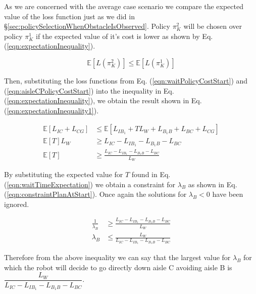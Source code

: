 \documentclass[a4paper,12pt]{article}
\begin{document}
			As we are concerned with the average case scenario we compare the expected value of the loss function just as we did in \S \ref{sec:policySelectionWhenObstacleIsObserved}. Policy $\pi_{K}^{2}$ will be chosen over policy $\pi_{K}^{1}$ if the expected value of it's cost is lower as shown by Eq. (\ref{eqn:expectationInequality}).
			
			\begin{equation}
			\mathbb{E}\left[L\left(\pi_{K}^{2}\right)\right] \leq \mathbb{E}\left[L\left(\pi_{K}^{1}\right)\right]
			\label{eqn:expectationInequality}
			\end{equation}
			
			Then, substituting the loss functions from Eq. (\ref{eqn:waitPolicyCostStart}) and (\ref{eqn:aisleCPolicyCostStart}) into the inequality in Eq. (\ref{eqn:expectationInequality}), we obtain the result shown in Eq. (\ref{eqn:expectationInequality1}).
			
			\begin{equation}
			\begin{split}
			\mathbb{E}[L_{IC}+L_{CG}] &\leq \mathbb{E}[L_{IB_1}+TL_W + L_{B_1B}+L_{BC}+L_{CG}] \\
			\mathbb{E}[T]L_W &\geq L_{IC}-L_{IB_1}-L_{B_1B}-L_{BC}\\
			\mathbb{E}[T] &\geq \frac{L_{IC}-L_{IB_1}-L_{B_1B}-L_{BC}}{L_W}
			\end{split}
			\label{eqn:expectationInequality1}
			\end{equation}
			
			By substituting the expected value for $T$ found in Eq. (\ref{eqn:waitTimeExpectation}) we obtain a constraint for $\lambda_B$ as shown in Eq. (\ref{eqn:constraintPlanAtStart}). Once again the solutions for $\lambda_B < 0$ have been ignored. 
			
			\begin{equation}
			\begin{split}
			\frac{1}{\lambda_B} &\geq \frac{L_{IC}-L_{IB_1}-L_{B_1B}-L_{BC}}{L_W}\\
			\lambda_B &\leq \frac{L_W}{L_{IC}-L_{IB_1}-L_{B_1B}-L_{BC}}
			\end{split}
			\label{eqn:constraintPlanAtStart}
			\end{equation}
			
			Therefore from the above inequality we can say that the largest value for $\lambda_B$ for which the robot will decide to go directly down aisle C avoiding aisle B is $ \dfrac{L_W}{L_{IC}-L_{IB_1}-L_{B_1B}-L_{BC}} $.
		
\end{document}
